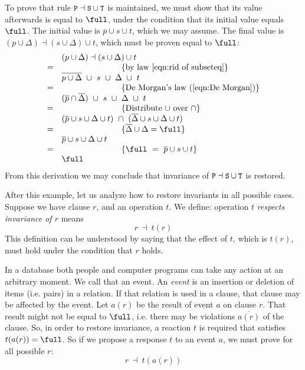 \documentclass[11pt,a4paper,fleqn,oneside]{article}
\newcommand{\code}[1]{\text{\tt\small #1}}
\def\define#1{\label{dfn:#1}{\em #1}\index{#1}}
\newcommand{\cmpl}[1]{\overline{#1}}
\newcommand{\subs}{\dashv}
\begin{document}
	To prove that rule $\code{P}\subs\code{S}\cup\code{T}$ is maintained,
	we must show that its value afterwards is equal to $\full$,
	under the condition that its initial value equals $\full$.
	The initial value is $\cmpl{p}\cup s\cup t$, which we may assume.
	The final value is $(p\cup\Delta)\subs(s\cup\Delta)\cup t$, which must be proven equal to $\full$:
\[\begin{array}{cl}
&(p\cup\Delta)\subs(s\cup\Delta)\cup t\\
=&\hspace{1in}\{\hbox{by law \ref{eqn:rid of subseteq}}\}\\
&\cmpl{p\cup\Delta}\ \cup\ s\ \cup\ \Delta\ \cup\ t\\
=&\hspace{1in}\{\hbox{De Morgan's law (\ref{eqn:De Morgan})}\}\\
&(\cmpl{p}\cap\cmpl{\Delta})\ \cup\ s\ \cup\ \Delta\ \cup\ t\\
=&\hspace{1in}\{\hbox{Distribute $\cup$ over $\cap$}\}\\
&(\cmpl{p}\cup s\cup\Delta\cup t)\ \cap\ (\cmpl{\Delta}\cup s\cup\Delta\cup t)\\
=&\hspace{1in}\{\cmpl{\Delta}\cup\Delta=\full\}\\
&\cmpl{p}\cup s\cup\Delta\cup t\\
=&\hspace{1in}\{\full\ =\ \cmpl{p}\cup s\cup t\}\\
&\full
\end{array}\]
	From this derivation we may conclude that invariance of $\code{P}\subs\code{S}\cup\code{T}$ is restored.
	
	After this example, let us analyze how to restore invariants in all possible cases.	
	Suppose we have clause $r$, and an operation $t$.
	We define: operation $t$ \define{respects invariance of $r$} means	
\begin{equation}
r\ \subs\ t(r)
\label{axi:invariance}
\end{equation}	
	This definition can be understood by saying that the effect of $t$,
	which is $t(r)$,
	must hold under the condition that $r$ holds.

	In a database both people and computer programs
	can take any action at an arbitrary moment.
	We call that an event.
	An \define{event} is an insertion or deletion of items (i.e. pairs) in a relation.
	If that relation is used in a clause, that clause may be affected by the event.
	Let $a(r)$ be the result of event $a$ on clause $r$.
	That result might not be equal to $\full$, i.e. there may be violations $\cmpl{a(r)}$ of the clause.
	So, in order to restore invariance, a reaction $t$ is required that satisfies $t(a(r))=\full$.
	So if we propose a response $t$ to an event $a$, we must prove for all possible $r$:
\begin{equation}
	r\ \subs\ t(a(r))
\label{axi:code fragment}
\end{equation}
\end{document}
